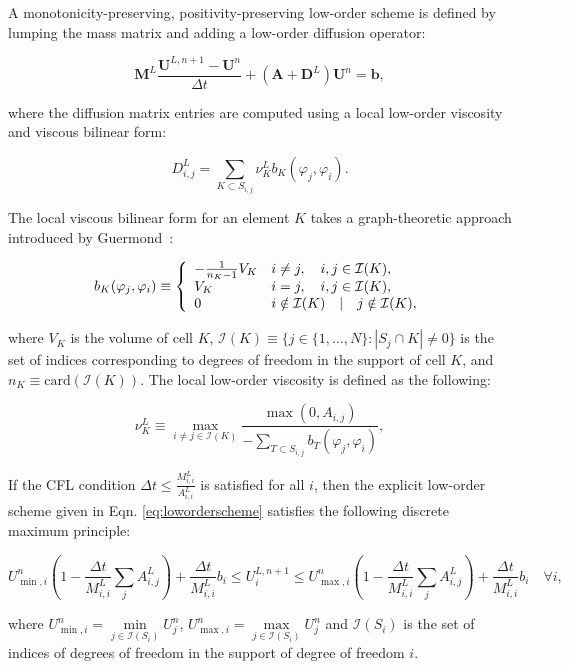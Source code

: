 A monotonicity-preserving, positivity-preserving low-order scheme
is defined by lumping the mass matrix and adding a low-order diffusion
operator:

\begin{equation}\label{eq:loworderscheme}
   \mathbf{M}^L\frac{\mathbf{U}^{L,n+1}-\mathbf{U}^n}{\Delta t}
      +\left(\mathbf{A}+\mathbf{D}^L\right)\mathbf{U}^n = \mathbf{b},
\end{equation}

where the diffusion matrix entries are computed using a local low-order
viscosity and viscous bilinear form:

\begin{equation}\label{eq:loworderD}
   D^L_{i,j} = \sum\limits_{K\subset S_{i,j}}\nu_K^L b_K(\varphi_j,\varphi_i).
\end{equation}

The local viscous bilinear form for an element $K$ takes a graph-theoretic
approach introduced by Guermond~\cite{guermond_firstorder}:

\begin{equation}\label{eq:bilinearform}
      b_K(\varphi_j, \varphi_i) \equiv \left\{\begin{array}{l l}
         -\frac{1}{n_K - 1}V_K & i\ne j, \quad i,j\in \mathcal{I}(K),\\
         V_K                   & i = j,  \quad i,j\in \mathcal{I}(K),\\
         0                     & i\notin\mathcal{I}(K) \quad | \quad j\notin\mathcal{I}(K),
      \end{array}\right.
\end{equation}

where $V_K$ is the volume of cell $K$,
$\mathcal{I}(K)\equiv \{j\in\{1,\ldots,N\}: |S_j\cap K|\ne 0\}$
is the set of indices corresponding to degrees of freedom in
the support of cell $K$, and $n_K \equiv \mbox{card}(\mathcal{I}(K))$.
The local low-order viscosity is defined as the following:

\begin{equation}
   \nu_K^L \equiv \max\limits_{i\ne j\in \mathcal{I}(K)}\frac{\max(0,A_{i,j})}
      {-\sum\limits_{T\subset S_{i,j}} b_T(\varphi_j, \varphi_i)},
\end{equation}

If the CFL condition $\Delta t \leq \frac{M_{i,i}^L}{A_{i,i}^L}$
is satisfied for all $i$, then the explicit
low-order scheme given in Eqn. \ref{eq:loworderscheme} satisfies the following
discrete maximum principle:

\begin{equation}\label{eq:dmp}
   U_{\min,i}^n\left(1-\frac{\Delta t}{M_{i,i}^L}
      \sum\limits_j A^L_{i,j}\right)
      + \frac{\Delta t}{M_{i,i}^L}b_i\leq
   U_i^{L,n+1}\leq
   U_{\max,i}^n\left(1-\frac{\Delta t}{M_{i,i}^L}
      \sum\limits_j A^L_{i,j}\right)
      + \frac{\Delta t}{M_{i,i}^L}b_i\quad\forall i,
\end{equation}

where $U_{\min,i}^n = \min\limits_{j\in \mathcal{I}(S_i)}U_j^n$,
$U_{\max,i}^n = \max\limits_{j\in \mathcal{I}(S_i)}U_j^n$
and $\mathcal{I}(S_i)$ is the set of indices of degrees of freedom in the
support of degree of freedom $i$.
